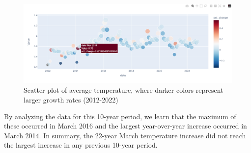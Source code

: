 \documentclass{apmcmthesis}
\begin{document}
\begin{figure}[!h]
    \centering
    \includegraphics[width=15cm]{APMCMThesis/figures/增长率.png}
    \caption{Scatter plot of average temperature, where darker colors represent larger growth rates (2012-2022)}
    \label{fig3}
\end{figure}
By analyzing the data for this 10-year period, we learn that the maximum of these occurred in March 2016 and the largest year-over-year increase occurred in March 2014\cite{fig3}. In summary, the 22-year March temperature increase did not reach the largest increase in any previous 10-year period.
\end{document}
